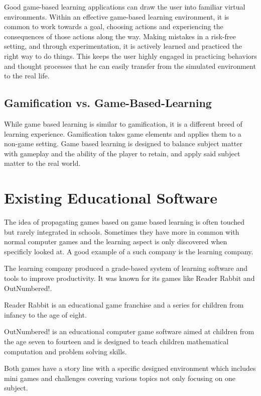 Good game-based learning applications can draw the user into familiar virtual environments.
Within an effective game-based learning environment, it is common to work towards a goal,
choosing actions and experiencing the consequences of those actions along the way.
Making mistakes in a risk-free setting, and through experimentation,
it is actively learned and practiced the right way to do things.
This keeps the user highly engaged in practicing behaviors and thought processes that he can easily transfer from the
simulated environment to the real life\cite{gal}.

\subsection{Gamification vs. Game-Based-Learning}\label{subsec:gamification-vs.-game-based-learning}
While game based learning is similar to gamification, it is a different breed of learning experience.
Gamification takes game elements and applies them to a non-game setting.
Game based learning is designed to balance subject matter with gameplay and the ability of the player to retain,
and apply said subject matter to the real world.

\section{Existing Educational Software}\label{sec:existing-educational-software}
The idea of propagating games based on game based learning is often touched but rarely integrated in schools.
Sometimes they have more in common with normal computer games and the learning aspect is only discovered when specificly looked at.
A good example of a such company is the learning company\cite{tlc}.

The learning company produced a grade-based system of learning software and tools to improve productivity.
It was known for its games like Reader Rabbit\cite{readerrabbit} and OutNumbered!\cite{outnumbered}.

Reader Rabbit is an educational game franchise and a series for children from infancy to the age of eight.

OutNumbered! is an educational computer game software aimed at children from the age seven to fourteen and
is designed to teach children mathematical computation and problem solving skills.

Both games have a story line with a specific designed environment which includes mini games and challenges covering
various topics not only focusing on one subject.

